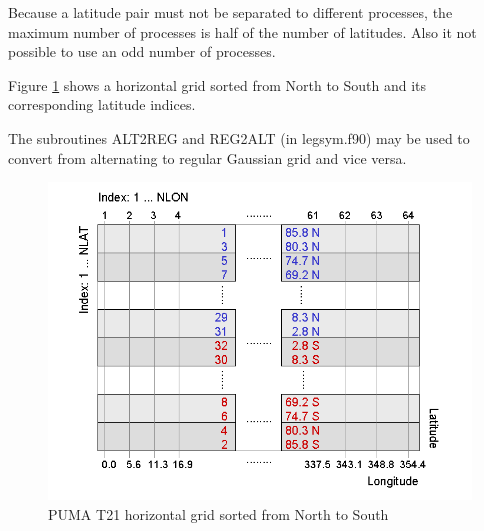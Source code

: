 Because a latitude pair must not be separated to different processes,
the maximum number of processes is half of the number of latitudes.
Also it not possible to use an odd number of processes.


Figure \ref{pumat21lgrid} shows a horizontal grid sorted from North to South
and its corresponding latitude indices.

The subroutines ALT2REG and REG2ALT (in legsym.f90) may be used to convert from
alternating to regular Gaussian grid and vice versa.




\begin{figure}
   \centering
   \includegraphics[width=14cm]{Pics/PUMA_alternate_grid_geogr.png}
   \caption[]{PUMA T21 horizontal grid sorted from North to South}
   \label{pumat21lgrid}
\end{figure}



